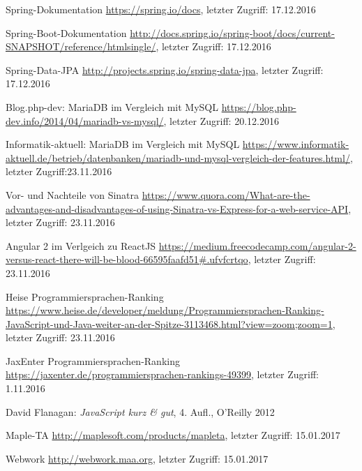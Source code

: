 \listoffigures
\begin{thebibliography}{}


Spring-Dokumentation
\url{https://spring.io/docs}, letzter Zugriff: 17.12.2016

Spring-Boot-Dokumentation
\url{http://docs.spring.io/spring-boot/docs/current-SNAPSHOT/reference/htmlsingle/}, letzter Zugriff: 17.12.2016

Spring-Data-JPA
\url{http://projects.spring.io/spring-data-jpa}, letzter Zugriff: 17.12.2016

Blog.php-dev: MariaDB im Vergleich mit MySQL
\url{https://blog.php-dev.info/2014/04/mariadb-vs-mysql/}, letzter Zugriff: 20.12.2016

Informatik-aktuell: MariaDB im Vergleich mit MySQL
\url{https://www.informatik-aktuell.de/betrieb/datenbanken/mariadb-und-mysql-vergleich-der-features.html/}, letzter Zugriff:23.11.2016

Vor- und Nachteile von Sinatra
\url{https://www.quora.com/What-are-the-advantages-and-disadvantages-of-using-Sinatra-vs-Express-for-a-web-service-API}, letzter Zugriff: 23.11.2016

Angular 2 im Verlgeich zu ReactJS
\url{https://medium.freecodecamp.com/angular-2-versus-react-there-will-be-blood-66595faafd51#.ufvfcrtqo}, letzter Zugriff: 23.11.2016

Heise Programmiersprachen-Ranking
\url{https://www.heise.de/developer/meldung/Programmiersprachen-Ranking-JavaScript-und-Java-weiter-an-der-Spitze-3113468.html?view=zoom;zoom=1}, letzter Zugriff: 23.11.2016

JaxEnter Programmiersprachen-Ranking \url{https://jaxenter.de/programmiersprachen-rankings-49399}, letzter Zugriff: 1.11.2016

David Flanagan: 
\emph{JavaScript kurz & gut}, 4. Aufl., O'Reilly 2012

Maple-TA \url{http://maplesoft.com/products/mapleta}, letzter Zugriff: 15.01.2017

Webwork \url{http://webwork.maa.org}, letzter Zugriff: 15.01.2017


\end{thebibliography}

